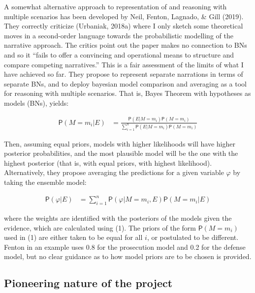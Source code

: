 \documentclass[11pt,dvipsnames,enabledeprecatedfontcommands]{scrartcl}
\newcommand{\pr}[1]{\mathsf{P}(#1)}
\begin{document}
A somewhat alternative approach to representation of and reasoning with
multiple scenarios has been developed by Neil, Fenton, Lagnado, \& Gill
(2019). They correctly criticize (Urbaniak, 2018a) where I only sketch
some theoretical moves in a second-order language towards the
probabilistic modelling of the narrative approach. The critics point out
the paper makes no connection to BNs and so it ``fails to offer a
convincing and operational means to structure and compare competing
narratives.'' This is a fair assessment of the limits of what I have
achieved so far. They propose to represent separate narrations in terms
of separate BNs, and to deploy bayesian model comparison and averaging
as a tool for reasoning with multiple scenarios. That is, Bayes Theorem
with hypotheses as models (BNs), yields:

\vspace{-3mm}

\begin{align}
\pr{M=m_i\vert E} & = \frac{
\pr{E\vert M = m_i}\pr{M= m_i}
}
{
\sum_{i=1}^{n}\pr{E \vert M = m_i}\pr{M = m_i}
}
\end{align}

\noindent Then, assuming equal priors, models with higher likelihoods
will have higher posterior probabilities, and the most plausible model
will be the one with the highest posterior (that is, with equal priors,
with highest likelihood). Alternatively, they propose averaging the
predictions for a given variable \(\varphi\) by taking the ensemble
model:

\vspace{-3mm}

\begin{align}
\pr{\varphi \vert E} & = \sum_{i=1}^n \pr{\varphi \vert M=m_i, E} \pr{M=m_i\vert E}
\end{align}

\vspace{-2mm}

\noindent where the weights are identified with the posteriors of the
models given the evidence, which are calculated using (1). The priors of
the form \(\pr{M = m_i}\) used in (1) are either taken to be equal for
all \(i\), or postulated to be different. Fenton in an example uses 0.8
for the prosecution model and 0.2 for the defense model, but no clear
guidance as to how model priors are to be chosen is provided.

\subsection{Pioneering nature of the
project}\label{pioneering-nature-of-the-project}
\end{document}
